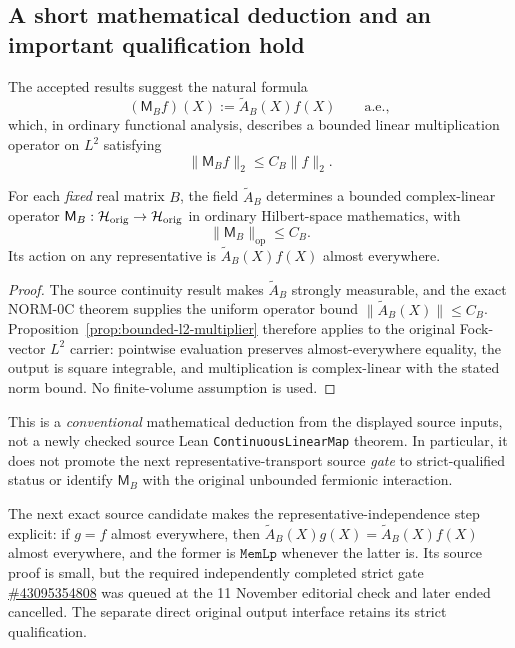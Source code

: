 \subsection{A short mathematical deduction and an important qualification hold}
The accepted results suggest the natural formula
\begin{equation}\label{eq:norm-multiplier-definition}
   (\mathsf M_B f)(X):=\widetilde A_B(X)f(X)
   \qquad\text{a.e.},
\end{equation}
which, in ordinary functional analysis, describes a bounded linear
multiplication operator on $L^2$ satisfying
\begin{equation}\label{eq:norm-multiplier-goal}
   \|\mathsf M_B f\|_2\le C_B\|f\|_2.
\end{equation}
\begin{proposition}\label{prop:normalized-class-multiplier}
For each \emph{fixed} real matrix $B$, the field
$\widetilde A_B$ determines a bounded complex-linear operator
$\mathsf M_B:\mathcal H_{\mathrm{orig}}\to\mathcal H_{\mathrm{orig}}$ in ordinary
Hilbert-space mathematics, with
\begin{equation}\label{eq:norm-multiplier-consequence}
 \|\mathsf M_B\|_{\mathrm{op}}\le C_B.
\end{equation}
Its action on any representative is
$\widetilde A_B(X)f(X)$ almost everywhere.
\end{proposition}
\begin{proof}
The source continuity result makes $\widetilde A_B$ strongly
measurable, and the exact NORM-0C theorem supplies the uniform
operator bound $\|\widetilde A_B(X)\|\le C_B$.
Proposition~\ref{prop:bounded-l2-multiplier}
therefore applies to the original Fock-vector $L^2$ carrier:
pointwise evaluation preserves almost-everywhere equality,
the output is square integrable, and multiplication
is complex-linear with the stated norm bound.
No finite-volume assumption is used.
\end{proof}
This is a \emph{conventional} mathematical deduction from the
displayed source inputs, not a newly checked source Lean
\texttt{ContinuousLinearMap} theorem. In particular, it
does not promote the next representative-transport source
\emph{gate} to strict-qualified status or identify
$\mathsf M_B$ with the original unbounded fermionic interaction.

The next exact source candidate makes the representative-independence
step explicit: if $g=f$ almost everywhere, then
$\widetilde A_B(X)g(X)=\widetilde A_B(X)f(X)$ almost everywhere, and
the former is $\texttt{MemLp}$ whenever the latter is. Its source
proof is small, but the required independently completed strict gate
\href{https://github.com/etblink/math/actions/runs/43095354808}{\#43095354808}
was queued at the 11 November editorial check and later ended
cancelled. The separate direct original output interface retains
its strict qualification.


